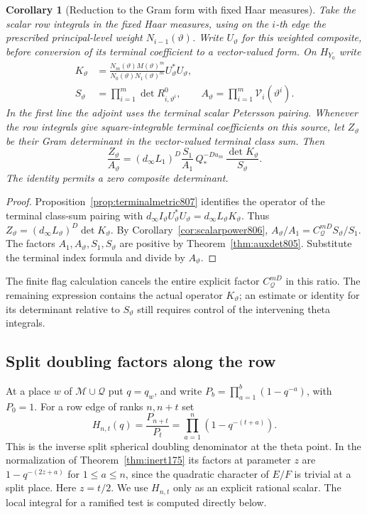 \documentclass[a4paper,11pt]{article}
\newtheorem{corollary}[proposition]{Corollary}
\theoremstyle{definition}
\theoremstyle{remark}
\numberwithin{equation}{section}
\begin{document}
\begin{corollary}[Reduction to the Gram form with fixed Haar measures]
\leavevmode\label{cor:remaininggram807}
Take the scalar row integrals in the fixed Haar measures,
using on the \(i\)-th edge the prescribed principal-level
weight \(N_{i-1}(\vartheta)\). Write \(U_\vartheta\) for this
weighted composite, before conversion of its terminal
coefficient to a vector-valued form. On \(H_{Y_0}\) write
\[
 \begin{split}
  K_\vartheta
     &=\frac{N_m(\vartheta)M(\vartheta)^m}
             {N_0(\vartheta)N_1(\vartheta)^m}
                    U_\vartheta^* U_\vartheta,\\
  S_\vartheta
     &=\prod_{i=1}^m \det R^0_{i,\vartheta^i},\qquad
  A_\vartheta=\prod_{i=1}^m\mathcal V_i(\vartheta^i).
 \end{split}
\]
In the first line the adjoint uses the terminal scalar
Petersson pairing. Whenever the row integrals give
square-integrable terminal coefficients on this source, let
\(Z_\vartheta\) be their Gram determinant in the vector-valued
terminal class sum. Then
\[
       \frac{Z_\vartheta}{A_\vartheta}
         =(d_\infty L_1)^D\frac{S_1}{A_1}\,
            Q_*^{-D u_m}\,\frac{\det K_\vartheta}{S_\vartheta}.
\]
The identity permits a zero composite determinant.
\end{corollary}
\begin{proof}
Proposition~\ref{prop:terminalmetric807} identifies the
operator of the terminal class-sum pairing with
\(d_\infty I_\vartheta U_\vartheta^*U_\vartheta
=d_\infty L_\vartheta K_\vartheta\).
Thus \(Z_\vartheta=(d_\infty L_\vartheta)^D\det K_\vartheta\).
By Corollary~\ref{cor:scalarpower806},
\(A_\vartheta/A_1=C_{\mathcal Q}^{mD} S_\vartheta/S_1\).
The factors \(A_1,A_\vartheta,S_1,S_\vartheta\) are positive
by Theorem~\ref{thm:auxdet805}. Substitute the terminal index
formula and divide by \(A_\vartheta\).
\end{proof}
The finite flag calculation cancels the entire explicit factor
\(C_{\mathcal Q}^{mD}\) in this ratio. The remaining expression
contains the actual operator \(K_\vartheta\); an estimate or
identity for its determinant relative to \(S_\vartheta\) still
requires control of the intervening theta integrals.
\clearpage

\subsection{Split doubling factors along the row}
\label{sec:flagdoubling808}
At a place \(w\) of \(\mathcal M\cup\mathcal Q\) put
\(q=q_w\), and write \(P_b=\prod_{a=1}^b(1-q^{-a})\), with
\(P_0=1\). For a row edge of ranks \(n,n+t\) set
\[
      H_{n,t}(q)=\frac{P_{n+t}}{P_t}
                    =\prod_{a=1}^{n}(1-q^{-(t+a)}).
\]
This is the inverse split spherical doubling denominator at
the theta point. In the normalization of
Theorem~\ref{thm:inert175} its factors at parameter \(z\)
are \(1-q^{-(2z+a)}\) for \(1\le a\le n\), since the quadratic
character of \(E/F\) is trivial at a split place. Here
\(z=t/2\). We use \(H_{n,t}\) only as an explicit rational
scalar. The local integral for a ramified test is computed
directly below.
\end{document}
